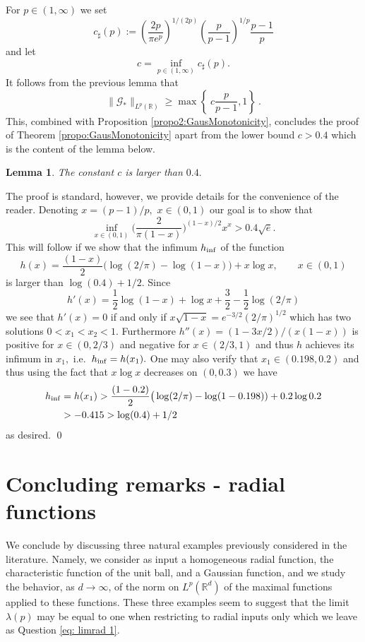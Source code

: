 \documentclass[a4paper, reqno]{amsart}
\newtheorem{lemma}[thm]{Lemma}
\theoremstyle{definition}
\newcommand{\mG}{\mathcal{G}}
\newcommand{\lm}{\lambda}
\begin{document}
 For $p\in(1,\infty)$ we set \[c_\sharp(p):=\left(\frac{2p}{\pi e^p}\right)^{1/(2p)} \left(\frac{p}{p-1}\right)^{1/p} \frac{p-1}{p}\]
and let
\[
c=\inf_{p\in (1,\infty)}c_\sharp(p).
\]
It follows from the previous lemma that 
$$\|\mG_\ast\|_{L^p(\mathbb{R})}\geq \max \left\lbrace \ c \frac{p}{p-1} , 1 \right\rbrace~.$$
This, combined with Proposition \ref{propo2:GausMonotonicity}, concludes the proof of Theorem \ref{propo:GausMonotonicity} apart from the lower bound $c>0.4$ which is the content of the lemma below. 
\begin{lemma}
    \label{lem: c>0.4}
The constant $c$ is larger than $0.4.$
\end{lemma}
The proof is standard, however, we provide details for the convenience of the reader. Denoting $x=(p-1)/p,$ $x\in (0,1)$ our goal is to show that
\[\inf_{x\in (0,1)} \bigg(\frac{2}{\pi(1-x)}\bigg)^{(1-x)/2}x^x>0.4\sqrt{e}.\]
This will follow if we show that the infimum $h_{\rm inf}$ of the function 
\[h(x)=\frac{(1-x)}{2}\big(\log (2/\pi)-\log(1-x))+x\log x,\qquad x\in (0,1)\]
is larger than $\log(0.4)+1/2.$ Since
\[h'(x)=\frac{1}{2}\log(1-x)+\log x+\frac{3}{2}-\frac{1}{2}\log(2/\pi)\]
we see that $h'(x)=0$ if and only if  $x\sqrt{1-x}=e^{-3/2}(2/\pi)^{1/2}$ which has two solutions $0<x_1<x_2<1.$ Furthermore $h''(x)=(1-3x/2)/(x(1-x))$ is positive for $x\in(0,2/3)$ and negative for $x\in (2/3,1)$ and thus $h$ achieves its infimum in $x_1,$ i.e.\ $h_{\rm inf}=h(x_1).$ One may also verify that $x_1\in (0.198,0.2)$ and thus using the fact that $x \log x$ decreases on $(0,0.3)$ we have 
\begin{align*}
h_{\rm inf}&= h(x_1)>\frac{(1-0.2)}{2}\big(\log (2/\pi)-\log(1-0.198))+0.2\log 0.2\\
& > -0.415>\log(0.4)+1/2
\end{align*}
as desired.
\qed

\section{ Concluding remarks - radial functions}\label{sec:ConcludingRemarks}

We conclude by discussing three natural examples previously considered in the literature. Namely, we consider as input a homogeneous radial function, the characteristic function of the unit ball, and a Gaussian function, and we study the behavior, as $d\rightarrow\infty$, of the norm on $L^p(\mathbb{R}^d)$ of the maximal functions applied to these functions. These three examples seem to suggest that the limit $\lm(p)$ may be equal to one when restricting to radial inputs only which we leave as Question \eqref{eq: limrad 1}.
\end{document}
